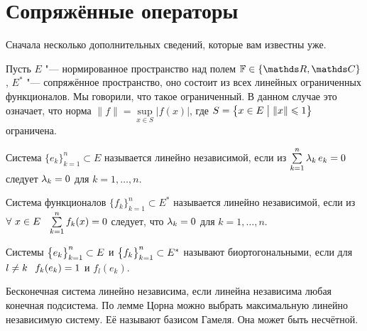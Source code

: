 \section{Сопряжённые операторы}
Сначала несколько дополнительных сведений, которые вам известны уже.

Пусть $E$ "--- нормированное пространство над полем $\F\in\{\R,\C\}$, $E^*$ "--- сопряжённое пространство, оно состоит из всех линейных ограниченных функционалов. Мы говорили, что такое ограниченный. В данном случае это означает, что норма $\|f\| = \sup\limits_{x\in S}\big|f(x)\big|$, где $S = \big\{x\in E\bigm|\|x\|\le 1\big\}$ ограничена.

\begin{Def}
  Система $\{e_k\}_{k=1}^n\subset E$ называется линейно независимой, если из $\RY k1n\l_k\,e_k=0$ следует $\l_k=0$ для $k=1,\dots,n$.

Система функционалов $\{f_k\}_{k=1}^n\subset E^*$ называется линейно независимой, если из $\forall\ x\in E\pau \RY k1n f_k(x)=0$ следует, что $\l_k=0$ для $k=1,\dots,n$.
\end{Def}

\begin{Def}
Системы $\ar ek1n\subset E$ и $\ar fk1n\subset E^*$ называют биортогональными, если для $l\ne k\pau f_k(e_k)=1$ и $f_l(e_k)$.
\end{Def}

Бесконечная система линейно независима, если линейна независима любая конечная подсистема. По лемме Цорна можно выбрать максимальную линейно независимую систему. Её называют базисом Гамеля. Она может быть несчётной.

